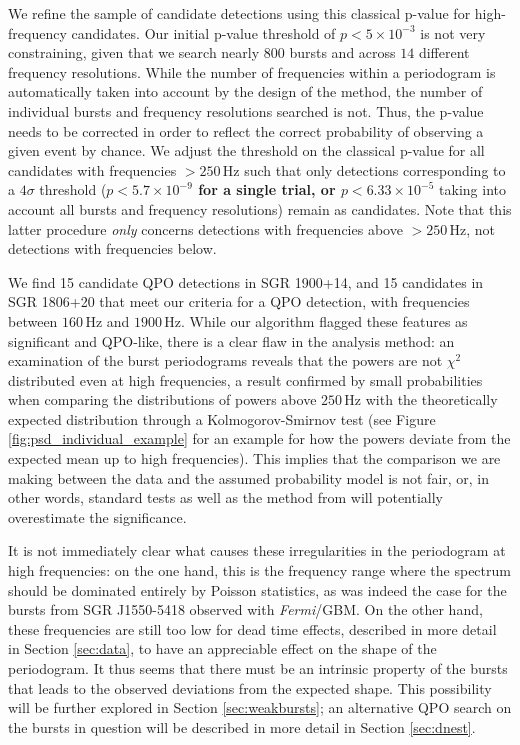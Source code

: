 \documentclass[numberedappendix]{emulateapj}
\newcommand{\hz}{\,\mathrm{Hz}}
\newcommand{\project}[1]{\textsl{#1}}
\newcommand{\fermi}{\project{Fermi}}
\begin{document}
We refine the sample of candidate detections using this classical p-value for high-frequency candidates. Our initial p-value threshold of $p < 5 \times 10^{-3}$ is not very constraining, given that we search nearly $800$ bursts and 
across $14$ different frequency resolutions. While the number of frequencies within a periodogram is automatically taken into account by the design of the method, the number of individual bursts and frequency resolutions
searched is not. Thus, the p-value needs to be corrected in order to reflect the correct probability of observing a given event by chance. We adjust the threshold on the classical p-value for all candidates with frequencies
$> 250 \hz$ such that only detections corresponding to a $4\sigma$ threshold (\textbf{$p < 5.7 \times 10^{-9}$ for a single trial, or $p < 6.33 \times 10^{-5}$} taking into account all bursts and frequency resolutions) remain
as candidates. Note that this latter procedure \textit{only} concerns detections with frequencies above $> 250 \hz$, not detections with frequencies below.

We find 15 candidate QPO detections in SGR 1900+14, and 15 candidates in SGR 1806+20 that meet our criteria for a QPO detection, with frequencies between $160\hz$ and $1900\hz$. While our algorithm
flagged these features as significant and QPO-like, there is a clear flaw in the analysis method: an examination of the burst periodograms reveals that the powers are not $\chi^2$ distributed even at high frequencies,
a result confirmed by small probabilities when comparing the distributions of powers above $250 \hz$ with the theoretically expected distribution through a Kolmogorov-Smirnov test (see Figure \ref{fig:psd_individual_example} for an example for how the powers deviate from the expected mean up to high frequencies). This implies that the comparison we are making between the data and the assumed probability model is not fair, or, in other words, standard tests as well as the method from \citet{huppenkothen2013} will potentially overestimate the significance.

It is not immediately clear what causes these irregularities in the periodogram at high frequencies: on the one hand, this is the frequency range where the spectrum should be dominated entirely by Poisson statistics,
as was indeed the case for the bursts from SGR J1550-5418 observed with \fermi/GBM. On the other hand, these frequencies are still too low for dead time effects, described in more detail in Section \ref{sec:data}, to have an
appreciable effect on the shape of the periodogram. It thus seems that there must be an intrinsic property of the bursts that leads to the observed deviations from the expected shape. This possibility will be further
explored in Section \ref{sec:weakbursts}; an alternative QPO search on the bursts in question will be described in more detail in Section \ref{sec:dnest}.
\end{document}
